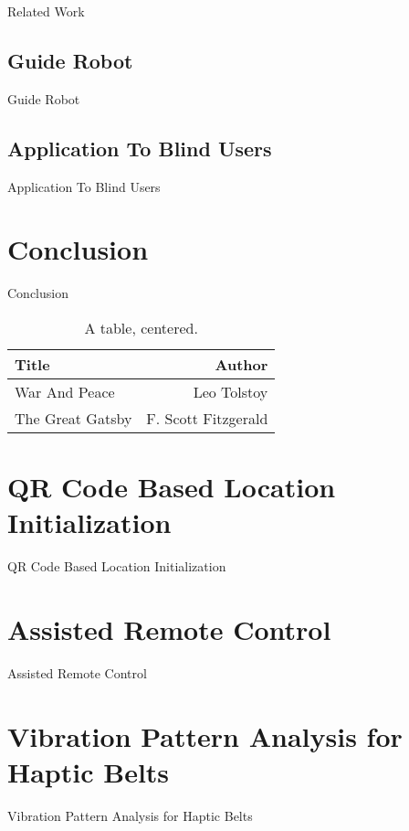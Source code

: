 \documentclass[12pt]{gatech-thesis}
\begin{document}
Related Work

\section{Guide Robot}

Guide Robot

\section{Application To Blind Users}

Application To Blind Users

\chapter{Conclusion}

Conclusion


\begin{table}
\caption{A table, centered.}
\begin{center}
\begin{tabular}{|l|r|}
  \hline 
Title & Author \\
\hline
War And Peace & Leo Tolstoy \\
The Great Gatsby & F. Scott Fitzgerald \\ \hline
\end{tabular}
\end{center}
\end{table}


\nocite{*}
\appendix
\chapter{QR Code Based Location Initialization}

QR Code Based Location Initialization

\chapter{Assisted Remote Control}

Assisted Remote Control

\chapter{Vibration Pattern Analysis for Haptic Belts}

Vibration Pattern Analysis for Haptic Belts
\end{document}
